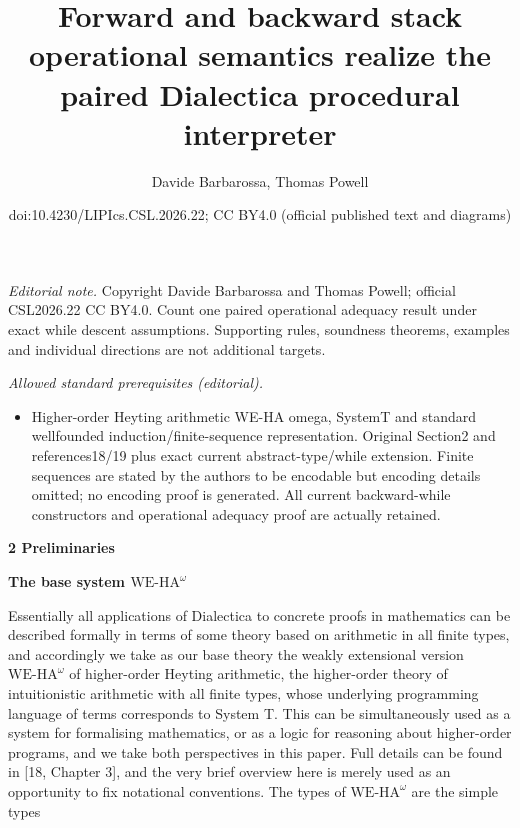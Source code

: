 \documentclass[10pt,a4paper]{article}
\title{Forward and backward stack operational semantics realize the paired Dialectica procedural interpreter}
\author{Davide Barbarossa, Thomas Powell}
\date{doi:10.4230/LIPIcs.CSL.2026.22; CC BY4.0 (official published text and diagrams)}
\begin{document}
\maketitle
\noindent\textit{Editorial note.} Copyright Davide Barbarossa and Thomas Powell; official CSL2026.22 CC BY4.0. Count one paired operational adequacy result under exact while descent assumptions. Supporting rules, soundness theorems, examples and individual directions are not additional targets.\par\medskip
\noindent\textit{Allowed standard prerequisites (editorial).}\begin{itemize}
\item Higher-order Heyting arithmetic WE-HA omega, SystemT and standard wellfounded induction/finite-sequence representation. Original Section2 and references18/19 plus exact current abstract-type/while extension. Finite sequences are stated by the authors to be encodable but encoding details omitted; no encoding proof is generated. All current backward-while constructors and operational adequacy proof are actually retained.
\end{itemize}\medskip

 
\par\medskip\noindent\textbf{2 Preliminaries}\par
 
 
\par\medskip\noindent\textbf{The base system $\mathrm{WE}\mbox{-}\mathrm{HA}^{\omega}$}\par
 
 
Essentially all applications of Dialectica to concrete proofs in mathematics can be described formally in terms of some theory based on arithmetic in all finite types, and accordingly we take as our base theory the weakly extensional version $\mathrm{WE}\mbox{-}\mathrm{HA}^{\omega}$ of higher-order Heyting arithmetic, the higher-order theory of intuitionistic arithmetic with all finite types, whose underlying programming language of terms corresponds to System T. This can be simultaneously used as a system for formalising mathematics, or as a logic for reasoning about higher-order programs, and we take both perspectives in this paper. Full details can be found in [18, Chapter 3], and the very brief overview here is merely used as an opportunity to fix notational conventions. The types of $\mathrm{WE}\mbox{-}\mathrm{HA}^{\omega}$ are the simple types\par
  
\end{document}
